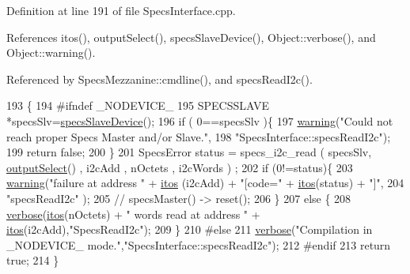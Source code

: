 Definition at line 191 of file Specs\+Interface.\+cpp.



References itos(), output\+Select(), specs\+Slave\+Device(), Object\+::verbose(), and Object\+::warning().



Referenced by Specs\+Mezzanine\+::cmdline(), and specs\+Read\+I2c().


\begin{DoxyCode}
193                                               \{
194 \textcolor{preprocessor}{#ifndef \_NODEVICE\_
}
195   SPECSSLAVE *specsSlv=\hyperlink{classSpecsInterface_ac8d4711197f484f055533ec1e5ae01a1}{specsSlaveDevice}();
196   \textcolor{keywordflow}{if} ( 0==specsSlv )\{
197     \hyperlink{classObject_a65cd4fda577711660821fd2cd5a3b4c9}{warning}(\textcolor{stringliteral}{"Could not reach proper Specs Master and/or Slave."},
198             \textcolor{stringliteral}{"SpecsInterface::specsReadI2c"});
199     \textcolor{keywordflow}{return} \textcolor{keyword}{false};
200   \}
201   SpecsError status = specs\_i2c\_read ( specsSlv, \hyperlink{classSpecsInterface_ab291ed03f4c2f0143e14c26ad5f648dd}{outputSelect}() , i2cAdd , nOctets , i2cWords )
      ;
202   \textcolor{keywordflow}{if} (0!=status)\{
203     \hyperlink{classObject_a65cd4fda577711660821fd2cd5a3b4c9}{warning}(\textcolor{stringliteral}{"failure at address "} + \hyperlink{Tools_8h_af330027dbdafb9a30768b3613c553e60}{itos} (i2cAdd) + \textcolor{stringliteral}{"[code="} + \hyperlink{Tools_8h_af330027dbdafb9a30768b3613c553e60}{itos}(status) + \textcolor{stringliteral}{"]"},
204             \textcolor{stringliteral}{"specsReadI2c"} );
205     \textcolor{comment}{//    specsMaster() -> reset();}
206   \}
207   \textcolor{keywordflow}{else} \{
208     \hyperlink{classObject_a83d2db2df682907ea1115ad721c1c4a1}{verbose}(\hyperlink{Tools_8h_af330027dbdafb9a30768b3613c553e60}{itos}(nOctets) + \textcolor{stringliteral}{" words read at address "} + \hyperlink{Tools_8h_af330027dbdafb9a30768b3613c553e60}{itos}(i2cAdd),\textcolor{stringliteral}{"SpecsReadI2c"});
209   \}
210 \textcolor{preprocessor}{#else
}
211   \hyperlink{classObject_a83d2db2df682907ea1115ad721c1c4a1}{verbose}(\textcolor{stringliteral}{"Compilation in \_NODEVICE\_ mode."},\textcolor{stringliteral}{"SpecsInterface::specsReadI2c"});
212 \textcolor{preprocessor}{#endif
}
213   \textcolor{keywordflow}{return} \textcolor{keyword}{true};
214 \}
\end{DoxyCode}
\mbox{\label{classSpecsInterface_ab61d866ec9b8a48e84a867004c1ed662}} 
